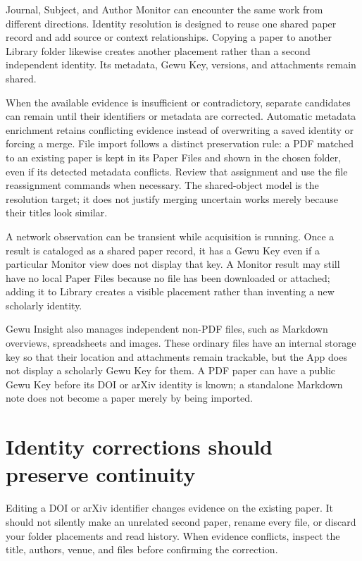 \documentclass[10pt,letterpaper,oneside]{scrreprt}
\begin{document}
Journal, Subject, and Author Monitor can encounter the same work from different directions. Identity resolution is designed to reuse one shared paper record and add source or context relationships. Copying a paper to another Library folder likewise creates another placement rather than a second independent identity. Its metadata, Gewu Key, versions, and attachments remain shared.

When the available evidence is insufficient or contradictory, separate candidates can remain until their identifiers or metadata are corrected. Automatic metadata enrichment retains conflicting evidence instead of overwriting a saved identity or forcing a merge. File import follows a distinct preservation rule: a PDF matched to an existing paper is kept in its Paper Files and shown in the chosen folder, even if its detected metadata conflicts. Review that assignment and use the file reassignment commands when necessary. The shared-object model is the resolution target; it does not justify merging uncertain works merely because their titles look similar.

A network observation can be transient while acquisition is running. Once a result is cataloged as a shared paper record, it has a Gewu Key even if a particular Monitor view does not display that key. A Monitor result may still have no local Paper Files because no file has been downloaded or attached; adding it to Library creates a visible placement rather than inventing a new scholarly identity.

Gewu Insight also manages independent non-PDF files, such as Markdown overviews, spreadsheets and images. These ordinary files have an internal storage key so that their location and attachments remain trackable, but the App does not display a scholarly Gewu Key for them. A PDF paper can have a public Gewu Key before its DOI or arXiv identity is known; a standalone Markdown note does not become a paper merely by being imported.

\section{Identity corrections should preserve continuity}\label{identity-corrections-should-preserve-continuity}

Editing a DOI or arXiv identifier changes evidence on the existing paper. It should not silently make an unrelated second paper, rename every file, or discard your folder placements and read history. When evidence conflicts, inspect the title, authors, venue, and files before confirming the correction.
\end{document}
